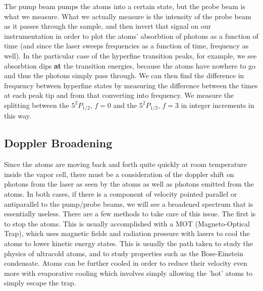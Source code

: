 \documentclass{article}
\newcommand{\twohalff}[2]{$5^2 #1_{1/2},\, f = #2$}
\begin{document}
  \hspace{.25cm}

  The pump beam pumps the atoms into a certain state, but the probe beam is what we measure.  What we actually measure is the intensity of the probe beam as it passes through the sample, and then invert that signal on our instrumentation in order to plot the atoms' absorbtion of photons as a function of time (and since the laser sweeps frequencies as a function of time, frequency as well).  In the particular case of the hyperfine transition peaks, for example, we see absorbtion dips \textbf{at} the transition energies, because the atoms have nowhere to go and thus the photons simply pass through.  We can then find the difference in frequency between hyperfine states by measuring the difference between the times at each peak tip and from that converting into frequency.  We measure the splitting between the \twohalff{P}{0} and the \twohalff{P}{3} in integer increments in this way.

  \subsection{Doppler Broadening}
  Since the atoms are moving back and forth quite quickly at room temperature inside the vapor cell, there must be a consideration of the doppler shift on photons from the laser as seen by the atoms as well as photons emitted from the atoms.  In both cases, if there is a component of velocity pointed parallel or antiparallel to the pump/probe beams, we will see a broadened spectrum that is essentially useless.  There are a few methods to take care of this issue.  The first is to stop the atoms.  This is usually accomplished with a MOT (Magneto-Optical Trap), which uses magnetic fields and radiation pressure with lasers to cool the atoms to lower kinetic energy states.  This is usually the path taken to study the physics of ultracold atoms, and to study properties such as the Bose-Einstein condensate.  Atoms can be further cooled in order to reduce their velocity even more with evaporative cooling which involves simply allowing the 'hot' atoms to simply escape the trap.

  \hspace{.25cm}
\end{document}
